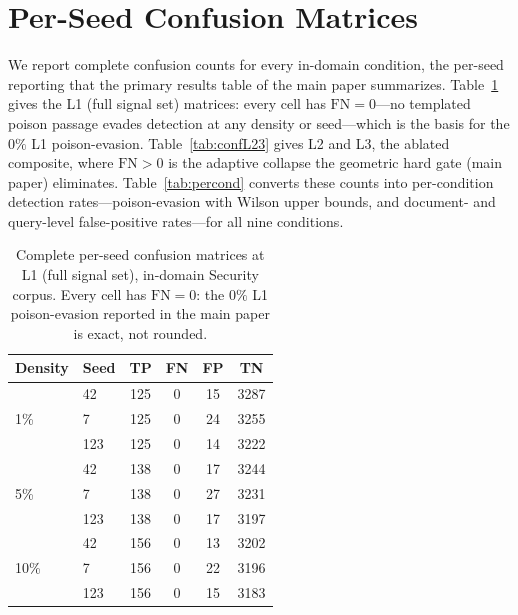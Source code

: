 \documentclass[10pt,journal,compsoc]{IEEEtran}
\begin{document}
\appendices

\section{Per-Seed Confusion Matrices}
\label{app:confusion}
We report complete confusion counts for every in-domain condition, the per-seed
reporting that the primary results table of the main paper summarizes. Table~\ref{tab:confL1}
gives the L1 (full signal set) matrices: every cell has $\mathrm{FN}=0$---no
templated poison passage evades detection at any density or seed---which is the
basis for the $0\%$ L1 poison-evasion. Table~\ref{tab:confL23} gives L2 and L3, the
ablated composite, where $\mathrm{FN}>0$ is the adaptive collapse the geometric hard
gate (main paper) eliminates. Table~\ref{tab:percond} converts these
counts into per-condition detection rates---poison-evasion with Wilson upper bounds,
and document- and query-level false-positive rates---for all nine conditions.

\begin{table}[H]
\centering
\caption{Complete per-seed confusion matrices at L1 (full signal set), in-domain
Security corpus. Every cell has $\mathrm{FN}=0$: the $0\%$ L1 poison-evasion reported
in the main paper is exact, not rounded.}
\label{tab:confL1}
\begin{tabular}{llcccc}
\toprule
Density & Seed & TP & FN & FP & TN \\
\midrule
\multirow{3}{*}{1\%}  & 42  & 125 & 0 & 15 & 3287 \\
                      & 7   & 125 & 0 & 24 & 3255 \\
                      & 123 & 125 & 0 & 14 & 3222 \\
\midrule
\multirow{3}{*}{5\%}  & 42  & 138 & 0 & 17 & 3244 \\
                      & 7   & 138 & 0 & 27 & 3231 \\
                      & 123 & 138 & 0 & 17 & 3197 \\
\midrule
\multirow{3}{*}{10\%} & 42  & 156 & 0 & 13 & 3202 \\
                      & 7   & 156 & 0 & 22 & 3196 \\
                      & 123 & 156 & 0 & 15 & 3183 \\
\bottomrule
\end{tabular}
\end{table}
\end{document}
